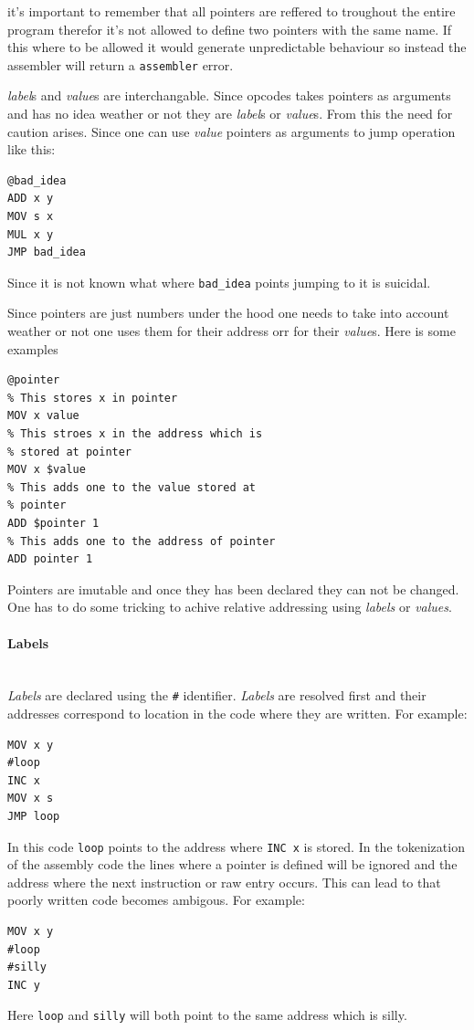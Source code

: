 \documentclass{article}
\newcommand{\V}{\verb}
\begin{document}
it's important to remember that all pointers are reffered to troughout the entire
program therefor it's not allowed to define two pointers with the same name. If
this where to be allowed it would generate unpredictable behaviour so instead
the assembler will return a \V+assembler+ error.

\emph{label}s and \emph{value}s are interchangable. Since opcodes takes pointers as arguments
and has no idea weather or not they are \emph{label}s or \emph{value}s. From this the need for
caution arises. Since one can use \emph{value} pointers as arguments to jump operation
like this:
\begin{verbatim}
@bad_idea
ADD x y
MOV s x
MUL x y
JMP bad_idea
\end{verbatim}
Since it is not known what where \V+bad_idea+ points jumping to it is suicidal.

Since pointers are just numbers under the hood one needs to take into account
weather or not one uses them for their address orr for their \emph{value}s. Here is some
examples
\begin{verbatim}
@pointer
% This stores x in pointer
MOV x value
% This stroes x in the address which is
% stored at pointer
MOV x $value
% This adds one to the value stored at 
% pointer
ADD $pointer 1
% This adds one to the address of pointer
ADD pointer 1
\end{verbatim}

Pointers are imutable and once they has been declared they can not be changed.
One has to do some tricking to achive relative addressing using \emph{labels} or
\emph{values}.


\paragraph{Labels} \
\\
\emph{Labels} are declared using the \V+#+ identifier.
\emph{Labels} are resolved first and their addresses
correspond to location in the code where they are written. For example:
\begin{verbatim}
MOV x y
#loop
INC x
MOV x s
JMP loop
\end{verbatim}
In this code \V+loop+ points to the address where \V+INC x+ is stored. In the
tokenization of the assembly code the lines where a pointer is defined will be
ignored and the address where the next instruction or raw entry occurs. This can
lead to that poorly written code becomes ambigous. For example:
\begin{verbatim}
MOV x y
#loop
#silly
INC y
\end{verbatim}
Here \V+loop+ and \V+silly+ will both point to the same address which is silly.
\end{document}
